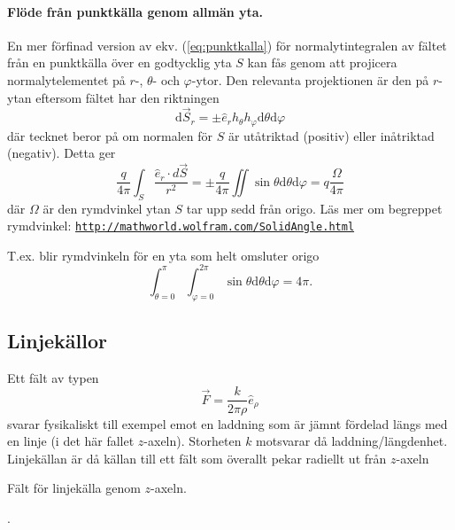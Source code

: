 \documentclass[%
oneside,                 %
final,                   %
10pt]{article}
\newenvironment{warning_mdfboxadmon}[1][]{
\begin{warning_mdfboxmdframed}[frametitle=#1]
}
{
\end{warning_mdfboxmdframed}
}
\begin{document}
\paragraph{Flöde från punktkälla genom allmän yta.}
En mer förfinad version av ekv. (\ref{eq:punktkalla}) för normalytintegralen av fältet från en punktkälla över en godtycklig yta $S$ kan fås genom att projicera normalytelementet på $r$-, $\theta$- och $\varphi$-ytor. Den relevanta projektionen är den på $r$-ytan eftersom fältet har den riktningen
\begin{equation}
\mbox{d}\vec{S}_r = \pm \hat{e}_r h_\theta h_\varphi \mbox{d}\theta \mbox{d}\varphi 
\end{equation}
där tecknet beror på om normalen för $S$ är utåtriktad (positiv) eller inåtriktad (negativ). Detta ger 
\begin{equation}
\frac{q}{4\pi} \int_S \frac{\hat{e}_r\cdot d\vec S}{r^2} = \pm \frac{q}{4\pi} \iint \sin\theta \mbox{d}\theta \mbox{d}\varphi = q \frac{\Omega}{4\pi} 
\end{equation}
där $\Omega$ är den rymdvinkel ytan $S$ tar upp sedd från origo. Läs mer om begreppet rymdvinkel: \href{{http://mathworld.wolfram.com/SolidAngle.html}}{\nolinkurl{http://mathworld.wolfram.com/SolidAngle.html}}

T.ex. blir rymdvinkeln för en yta som helt omsluter origo
\begin{equation}
\int_{\theta=0}^\pi \int_{\varphi=0}^{2\pi} \sin\theta \mbox{d}\theta \mbox{d}\varphi = 4\pi.
\end{equation}

\subsection*{Linjekällor}

Ett fält av typen
\begin{equation}
  \vec{F} = \frac{k}{2 \pi \rho} \hat{e}_{\rho}
\end{equation}
svarar fysikaliskt till exempel emot en laddning som är jämnt fördelad längs med en linje (i det här fallet $z$-axeln). Storheten $k$ motsvarar då laddning/längdenhet. Linjekällan är då källan till ett fält som överallt pekar radiellt ut från $z$-axeln 


\begin{warning_mdfboxadmon}[Rita]
Fält för linjekälla genom $z$-axeln.
\end{warning_mdfboxadmon} %

.
\end{document}
